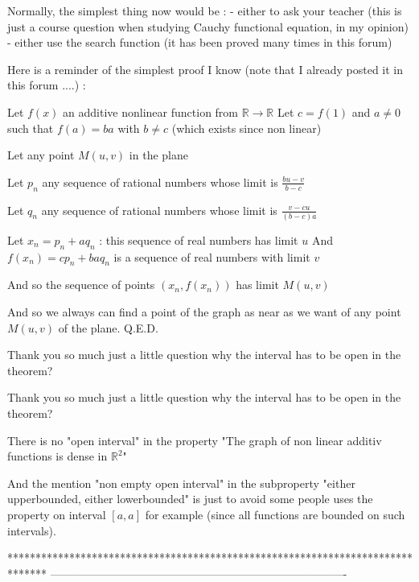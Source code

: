 \begin{solution}
	\begin{tcolorbox}Normally, the simplest thing now would be :
- either to ask your teacher (this is just a course question when studying Cauchy functional equation, in my opinion)
- either use the search function (it has been proved many times in this forum)

Here is a reminder of the simplest proof I know (note that I already posted it in this forum ....) :

Let $f(x)$ an additive nonlinear function from $\mathbb R\to\mathbb R$
Let $c=f(1)$ and $a\ne 0$ such that $f(a)=ba$ with $b\ne c$ (which exists since non linear)

Let any point $M(u,v)$ in the plane

Let $p_n$ any sequence of rational numbers whose limit is $\frac{bu-v}{b-c}$

Let $q_n$ any sequence of rational numbers whose limit is $\frac{v-cu}{(b-c)a}$

Let $x_n=p_n+aq_n$ : this sequence of real numbers has limit $u$
And $f(x_n)=cp_n+baq_n$ is a sequence of real numbers with limit $v$

And so the sequence of points $(x_n,f(x_n))$ has limit $M(u,v)$

And so we always can find a point of the graph as near as we want of any point $M(u,v)$ of the plane.
Q.E.D.\end{tcolorbox}

Thank you so much just a little question why the interval has to be open in the theorem?
\end{solution}



\begin{solution}
	\begin{tcolorbox}Thank you so much just a little question why the interval has to be open in the theorem?\end{tcolorbox}
There is no "open interval" in the property "The graph of non linear additiv functions is dense in $\mathbb R^2$"

And the mention "non empty open interval" in the subproperty "either upperbounded, either lowerbounded" is just to avoid some people uses the property on interval $[a,a]$ for example (since all functions are bounded on such intervals).



\end{solution}
*******************************************************************************
-------------------------------------------------------------------------------

